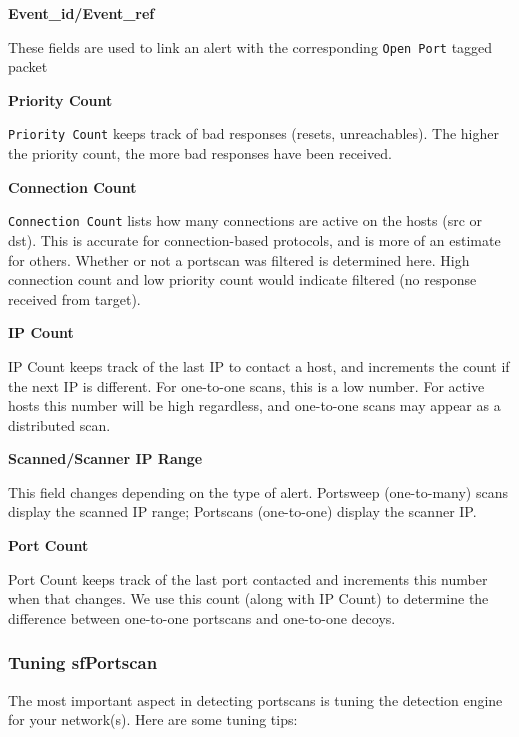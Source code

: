 \documentclass[english]{report}
\newcounter{slistnum}
\newenvironment{slist}
{ \begin{list}{ {\bf \arabic{slistnum}.} }{\usecounter{slistnum} } }
{ \end{list} }
\begin{document}
\begin{slist}

\item \textbf{Event\_id/Event\_ref}

These fields are used to link an alert with the corresponding \texttt{Open
Port} tagged packet

\item \textbf{Priority Count}

\texttt{Priority Count} keeps track of bad responses (resets, unreachables).
The higher the priority count, the more bad responses have been received.

\item \textbf{Connection Count}
     
\texttt{Connection Count} lists how many connections are active on the hosts
(src or dst). This is accurate for connection-based protocols, and is more of
an estimate for others. Whether or not a portscan was filtered is determined
here. High connection count and low priority count would indicate filtered (no
response received from target).

\item \textbf{IP Count}

IP Count keeps track of the last IP to contact a host, and increments the count
if the next IP is different. For one-to-one scans, this is a low number. For
active hosts this number will be high regardless, and one-to-one scans may
appear as a distributed scan.

\item \textbf{Scanned/Scanner IP Range}

This field changes depending on the type of alert. Portsweep (one-to-many)
scans display the scanned IP range; Portscans (one-to-one) display the scanner
IP. 

\item \textbf{Port Count}

Port Count keeps track of the last port contacted and increments this number
when that changes. We use this count (along with IP Count) to determine the
difference between one-to-one portscans and one-to-one decoys.  \end{slist}

\subsubsection{Tuning sfPortscan}
\label{tuning sfportscan}

The most important aspect in detecting portscans is tuning the detection engine
for your network(s).  Here are some tuning tips:
\end{document}

